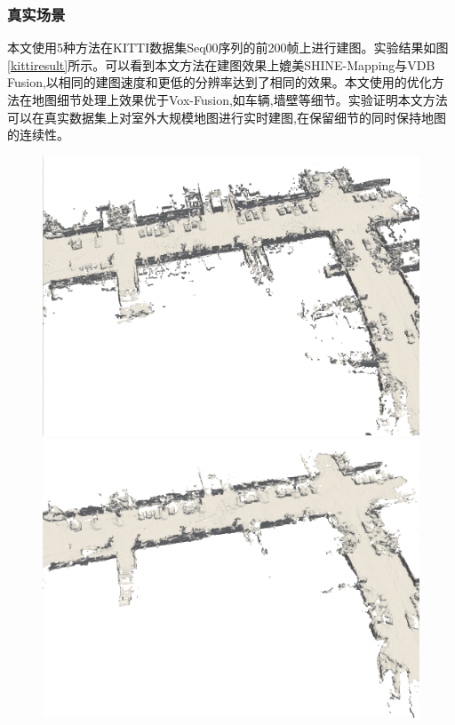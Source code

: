 \subsubsection{真实场景}
本文使用5种方法在KITTI数据集Seq00序列的前200帧上进行建图。实验结果如图\ref{kittiresult}所示。可以看到本文方法在建图效果上媲美SHINE-Mapping与VDB Fusion,以相同的建图速度和更低的分辨率达到了相同的效果。本文使用的优化方法在地图细节处理上效果优于Vox-Fusion,如车辆,墙壁等细节。实验证明本文方法可以在真实数据集上对室外大规模地图进行实时建图,在保留细节的同时保持地图的连续性。
\begin{figure}[htbp]
	\centering
	\begin{minipage}{0.5\linewidth}
		\centering
		\includegraphics[width=1\linewidth]{figures/kitti_1_vox.png}
	\end{minipage}\hfill
	\begin{minipage}{0.5\linewidth}
		\centering
		\includegraphics[width=1\linewidth]{figures/kitti_1_bce.png}

\end{minipage}
\end{figure}
